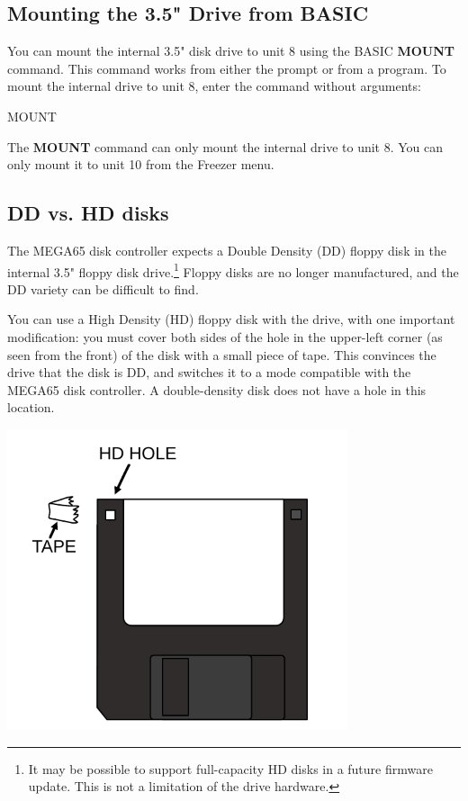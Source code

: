 \subsection{Mounting the 3.5" Drive from BASIC}

You can mount the internal 3.5" disk drive to unit 8 using the BASIC {\bf MOUNT} command. This command works from either the  prompt or from a program. To mount the internal drive to unit 8, enter the command without arguments:

\begin{screenoutput}
MOUNT
\end{screenoutput}

The {\bf MOUNT} command can only mount the internal drive to unit 8. You can only mount it to unit 10 from the Freezer menu.

\subsection{DD vs. HD disks}

The MEGA65 disk controller expects a Double Density (DD) floppy disk in the internal 3.5" floppy disk drive.\footnote{It may be possible to support full-capacity HD disks in a future firmware update. This is not a limitation of the drive hardware.} Floppy disks are no longer manufactured, and the DD variety can be difficult to find.

You can use a High Density (HD) floppy disk with the drive, with one important modification: you must cover both sides of the hole in the upper-left corner (as seen from the front) of the disk with a small piece of tape. This convinces the drive that the disk is DD, and switches it to a mode compatible with the MEGA65 disk controller. A double-density disk does not have a hole in this location.

\begin{center}
  \includegraphics[width=0.75\textwidth]{images/illustrations/floppy_hd.pdf}
\end{center}

